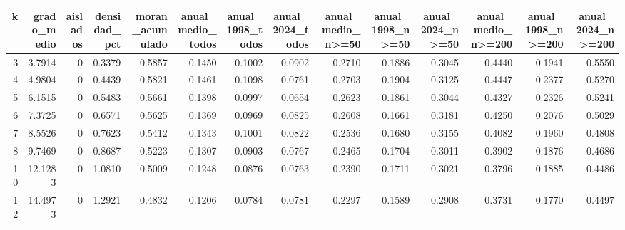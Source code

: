 \begin{tabular}{rrrrrrrrrrrrrr}
\toprule
k & grado\_medio & aislados & densidad\_pct & moran\_acumulado & anual\_medio\_todos & anual\_1998\_todos & anual\_2024\_todos & anual\_medio\_n>=50 & anual\_1998\_n>=50 & anual\_2024\_n>=50 & anual\_medio\_n>=200 & anual\_1998\_n>=200 & anual\_2024\_n>=200 \\
\midrule
3 & 3.7914 & 0 & 0.3379 & 0.5857 & 0.1450 & 0.1002 & 0.0902 & 0.2710 & 0.1886 & 0.3045 & 0.4440 & 0.1941 & 0.5550 \\
4 & 4.9804 & 0 & 0.4439 & 0.5821 & 0.1461 & 0.1098 & 0.0761 & 0.2703 & 0.1904 & 0.3125 & 0.4447 & 0.2377 & 0.5270 \\
5 & 6.1515 & 0 & 0.5483 & 0.5661 & 0.1398 & 0.0997 & 0.0654 & 0.2623 & 0.1861 & 0.3044 & 0.4327 & 0.2326 & 0.5241 \\
6 & 7.3725 & 0 & 0.6571 & 0.5625 & 0.1369 & 0.0969 & 0.0825 & 0.2608 & 0.1661 & 0.3181 & 0.4250 & 0.2076 & 0.5029 \\
7 & 8.5526 & 0 & 0.7623 & 0.5412 & 0.1343 & 0.1001 & 0.0822 & 0.2536 & 0.1680 & 0.3155 & 0.4082 & 0.1960 & 0.4808 \\
8 & 9.7469 & 0 & 0.8687 & 0.5223 & 0.1307 & 0.0903 & 0.0767 & 0.2465 & 0.1704 & 0.3011 & 0.3902 & 0.1876 & 0.4686 \\
10 & 12.1283 & 0 & 1.0810 & 0.5009 & 0.1248 & 0.0876 & 0.0763 & 0.2390 & 0.1711 & 0.3021 & 0.3796 & 0.1885 & 0.4486 \\
12 & 14.4973 & 0 & 1.2921 & 0.4832 & 0.1206 & 0.0784 & 0.0781 & 0.2297 & 0.1589 & 0.2908 & 0.3731 & 0.1770 & 0.4497 \\
\bottomrule
\end{tabular}
